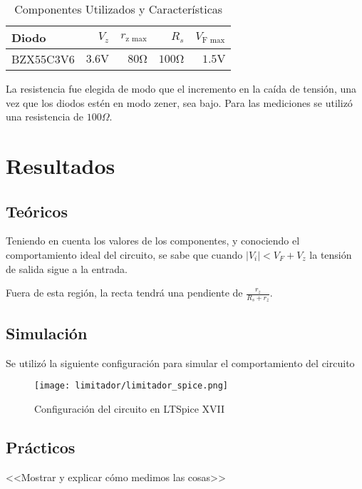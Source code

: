 \begin{table}[ht]
    \begin{center}
        \begin{tabular}{|l|r|r|r|r|}
            \hline
            Diodo & $V_z$ & $r_{\text{z max}}$ & $R_s$ & $V_{\text{F max}}$\\
            \hline
            BZX55C3V6 & $3.6 \si{\volt}$ & $80 \si{\ohm}$ & $100 \si{\ohm}$ & $1.5 \si{\volt}$ \\
            \hline
        \end{tabular}
        \caption{Componentes Utilizados y Características}
    \end{center}
\end{table}

La resistencia fue elegida de modo que el incremento en la caída de tensión, una vez que 
los diodos estén en modo zener, sea bajo. Para las mediciones se utilizó una 
resistencia de $100\Omega$.

\section{Resultados}

\subsection{Teóricos}
Teniendo en cuenta los valores de los componentes, y conociendo el comportamiento ideal 
del circuito, se sabe que cuando $|V_i|< V_F+V_z$ la tensión de salida sigue a la entrada.

Fuera de esta región, la recta tendrá una pendiente de $\frac{r_z}{R_s+r_z}$.
\subsection{Simulación}
Se utilizó la siguiente configuración para simular el comportamiento del circuito


\begin{figure}[H]
    \begin{center}
        \texttt{[image: limitador/limitador\_spice.png]}
        \caption{Configuración del circuito en LTSpice XVII}
    \end{center}
\end{figure}

\subsection{Prácticos}
<<Mostrar y explicar cómo medimos las cosas>>

